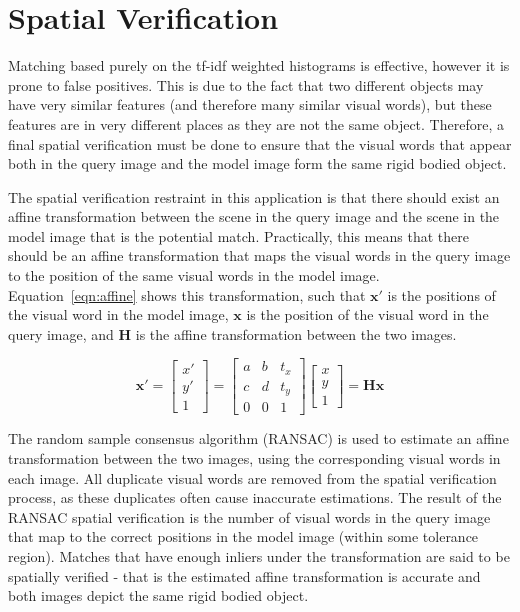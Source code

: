 \documentclass[11pt, onecolumn, a4paper, final]{report} %
\begin{document}
\section{Spatial Verification}
\label{sec:spatialverification}
Matching based purely on the tf-idf weighted histograms is effective, however it is prone to false positives. This is due to the fact that two different objects may have very similar features (and therefore many similar visual words), but these features are in very different places as they are not the same object. Therefore, a final spatial verification must be done to ensure that the visual words that appear both in the query image and the model image form the same rigid bodied object.

The spatial verification restraint in this application is that there should exist an affine transformation between the scene in the query image and the scene in the model image that is the potential match. Practically, this means that there should be an affine transformation that maps the visual words in the query image to the position of the same visual words in the model image. Equation~\ref{eqn:affine} shows this transformation, such that $\mathbf{x'}$ is the positions of the visual word in the model image, $\mathbf{x}$ is the position of the visual word in the query image, and $\mathbf{H}$ is the affine transformation between the two images.

\begin{equation}
\mathbf{x'}=
\left[ \begin{array}{c}
x' \\
y' \\
1
\end{array}\right]
=
\left[ \begin{array}{ccc}
a & b & t_x \\
c & d & t_y \\
0 & 0 & 1
\end{array}\right]
\left[ \begin{array}{c}
x \\
y \\
1
\end{array}\right]
= \mathbf{H}\mathbf{x}
\label{eqn:affine}
\end{equation} 

The random sample consensus algorithm (RANSAC) is used to estimate an affine transformation between the two images, using the corresponding visual words in each image. All duplicate visual words are removed from the spatial verification process, as these duplicates often cause inaccurate estimations. The result of the RANSAC spatial verification is the number of visual words in the query image that map to the correct positions in the model image (within some tolerance region). Matches that have enough inliers under the transformation are said to be spatially verified - that is the estimated affine transformation is accurate and both images depict the same rigid bodied object.
\end{document}
